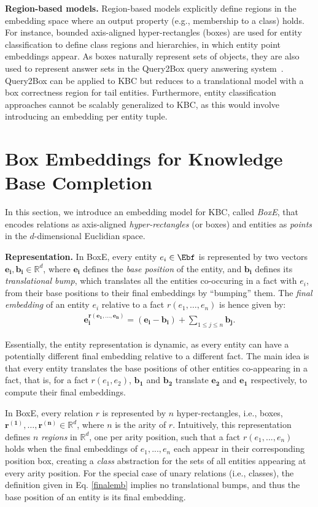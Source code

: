 \documentclass{article}
\begin{document}
\textbf{Region-based models.}
Region-based models explicitly define regions in the embedding space where an output property (e.g., membership to a class) holds. 
For instance, bounded axis-aligned hyper-rectangles (boxes) \cite{Box-ACL18,SubramanianC18,LiVZBM19} are used for entity classification to define class regions and hierarchies, in which entity point embeddings  appear. 
As boxes naturally represent sets of objects, they are also used to represent answer sets in the Query2Box query answering system~\cite{Ren20}. Query2Box can be applied to KBC but reduces to a translational model with a box correctness region for tail entities.
Furthermore, entity classification approaches cannot be scalably generalized to KBC, as this would involve introducing an embedding per entity tuple. 


\section{Box Embeddings for Knowledge Base Completion}
\label{sec:BoxE}
In this section, we introduce an embedding model for KBC, 
called \emph{BoxE}, that encodes relations as axis-aligned \emph{hyper-rectangles} (or boxes) and entities as \emph{points} in the $d$-dimensional Euclidian space.

\textbf{Representation.} In BoxE, every entity $e_i \in \Ebf$ is represented by two vectors $\bm{e_i}, \bm{b_i} \in \mathbb{R}^d$, where $\bm{e_i}$ defines the \emph{base position} of the entity, and $\bm{b_i}$ defines its \emph{translational bump}, which translates all the entities co-occuring in a fact with $e_i$, from their base positions to their final embeddings by ``bumping'' them.
The \emph{final embedding} of an entity $e_i$ relative to a fact $r(e_{1}, \ldots , e_{n})$ is hence given by: 
\begin{align}
\label{finalemb}
{\bm{e_i^{r(e_{1}, \ldots , e_{n})}} = (\bm{e_i} - \bm{b_i}) + \sum_{1 \leq j \leq n} \bm{b_{j}}}.
\end{align}

Essentially, the entity representation is dynamic, as every entity can have a potentially different final embedding relative to a different fact. The main idea is that every entity translates the base positions of other entities co-appearing in a fact, that is, for a fact $r(e_1, e_2)$, $\bm{b_1}$ and $\bm{b_2}$ translate $\bm{e_2}$ and $\bm{e_1}$ respectively, to compute their final embeddings.


In BoxE, every relation $r$ is represented by $n$ hyper-rectangles, i.e., boxes, $\bm{r^{(1)}}, \ldots, \bm{r^{(n)}} \in \mathbb{R}^d$, where $n$ is the arity of $r$. 
Intuitively, this representation defines $n$ \emph{regions} in $\mathbb{R}^d$, one per arity position, such that a fact $r(e_1, ..., e_n)$ holds when the final embeddings of $e_1, ..., e_n$ each appear in their corresponding position box, creating a \emph{class} abstraction for the sets of all entities appearing at every arity position.
For the special case of unary relations (i.e., classes), the definition given in Eq. \ref{finalemb} implies no translational bumps, and thus the base  position of an entity is its final embedding.
\end{document}
